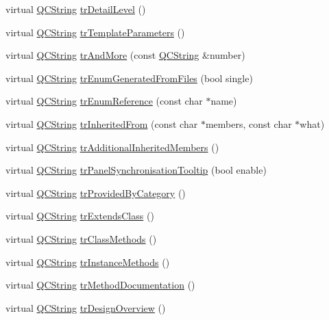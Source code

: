 \begin{DoxyCompactItemize}
\item 
virtual \hyperlink{class_q_c_string}{Q\-C\-String} \hyperlink{class_translator_ukrainian_a138b581235bf64a0338ed25ee0d1ad61}{tr\-Detail\-Level} ()
\item 
virtual \hyperlink{class_q_c_string}{Q\-C\-String} \hyperlink{class_translator_ukrainian_ad9599164391093757c91bbe746f694a5}{tr\-Template\-Parameters} ()
\item 
virtual \hyperlink{class_q_c_string}{Q\-C\-String} \hyperlink{class_translator_ukrainian_a391327398836ee03f1d00415b80cb997}{tr\-And\-More} (const \hyperlink{class_q_c_string}{Q\-C\-String} \&number)
\item 
virtual \hyperlink{class_q_c_string}{Q\-C\-String} \hyperlink{class_translator_ukrainian_a2039b9a9624800366462f980e8ebce70}{tr\-Enum\-Generated\-From\-Files} (bool single)
\item 
virtual \hyperlink{class_q_c_string}{Q\-C\-String} \hyperlink{class_translator_ukrainian_a0209ef4cc7768fc9abf62f7ffc95534e}{tr\-Enum\-Reference} (const char $\ast$name)
\item 
virtual \hyperlink{class_q_c_string}{Q\-C\-String} \hyperlink{class_translator_ukrainian_af8b8b1bb56a7ea74b11dad76e644968e}{tr\-Inherited\-From} (const char $\ast$members, const char $\ast$what)
\item 
virtual \hyperlink{class_q_c_string}{Q\-C\-String} \hyperlink{class_translator_ukrainian_a62da1a83afa60109108fba6ad327a06f}{tr\-Additional\-Inherited\-Members} ()
\item 
virtual \hyperlink{class_q_c_string}{Q\-C\-String} \hyperlink{class_translator_ukrainian_a1800c322fe577f6dfab2ab8eb463a78e}{tr\-Panel\-Synchronisation\-Tooltip} (bool enable)
\item 
virtual \hyperlink{class_q_c_string}{Q\-C\-String} \hyperlink{class_translator_ukrainian_a48bb5cf8c4d20b9215921504ca43c8cf}{tr\-Provided\-By\-Category} ()
\item 
virtual \hyperlink{class_q_c_string}{Q\-C\-String} \hyperlink{class_translator_ukrainian_a943bb1d0d3cf3c3ddca3616c21f815da}{tr\-Extends\-Class} ()
\item 
virtual \hyperlink{class_q_c_string}{Q\-C\-String} \hyperlink{class_translator_ukrainian_a00e0dc60db9c989dad1bc310b4bdf08c}{tr\-Class\-Methods} ()
\item 
virtual \hyperlink{class_q_c_string}{Q\-C\-String} \hyperlink{class_translator_ukrainian_ac194051c0538db0a70504f6d11fbf9b7}{tr\-Instance\-Methods} ()
\item 
virtual \hyperlink{class_q_c_string}{Q\-C\-String} \hyperlink{class_translator_ukrainian_a4666cdb4ca29df1818744d88fc17e619}{tr\-Method\-Documentation} ()
\item 
virtual \hyperlink{class_q_c_string}{Q\-C\-String} \hyperlink{class_translator_ukrainian_a5aeee72580ed889d0f0253be39800cc8}{tr\-Design\-Overview} ()
\end{DoxyCompactItemize}
